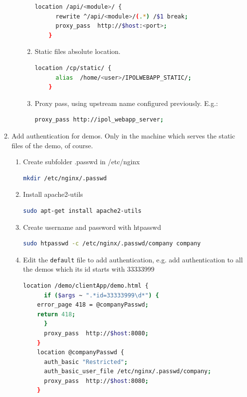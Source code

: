 \documentclass[a4paper,12pt]{article}
\begin{document}
\begin{enumerate}
\begin{enumerate}
\begin{enumerate}
    \begin{lstlisting}[language=Bash]
    location /api/<module>/ {
      rewrite ^/api/<module>/(.*) /$1 break;
      proxy_pass  http://$host:<port>;
    }
    \end{lstlisting}
    \item Static files absolute location.
    \begin{lstlisting}[language=Bash]
    location /cp/static/ {
      alias  /home/<user>/IPOLWEBAPP_STATIC/;
    }
    \end{lstlisting}
    \item Proxy pass, using upstream name configured previously.
    E.g.:
    \begin{lstlisting}[language=Bash]
    proxy_pass http://ipol_webapp_server;
    \end{lstlisting}

    \end{enumerate}
    \end{enumerate}
    \item Add authentication for demos. Only in the machine which serves the static files of the demo, of course.
    \begin{enumerate}
    \item Create subfolder .passwd in /etc/nginx
    \begin{lstlisting}[language=Bash]
    mkdir /etc/nginx/.passwd
    \end{lstlisting}
    \item Install apache2-utils
    \begin{lstlisting}[language=Bash]
    sudo apt-get install apache2-utils
    \end{lstlisting}
    \item Create username and password with htpasswd
    \begin{lstlisting}[language=Bash]
     sudo htpasswd -c /etc/nginx/.passwd/company company
    \end{lstlisting}
    \item Edit the {\tt default} file to add authentication, e.g. add authentication to all the demos which its id starts with 33333999
    \begin{lstlisting}[language=Bash]
    location /demo/clientApp/demo.html {
      if ($args ~ ".*id=33333999\d*") {
	error_page 418 = @companyPasswd;
	return 418;
      }
      proxy_pass  http://$host:8080;
    }
    location @companyPasswd {
      auth_basic "Restricted";
      auth_basic_user_file /etc/nginx/.passwd/company;
      proxy_pass  http://$host:8080;
    }
    \end{lstlisting}
    \end{enumerate}


\end{enumerate}
\end{document}
